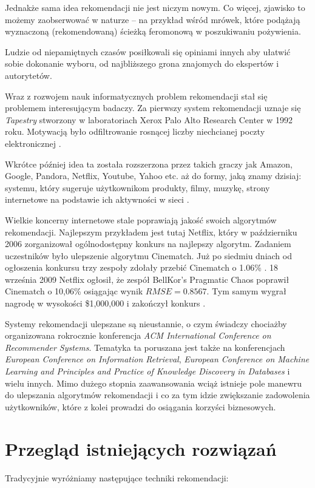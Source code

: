 \documentclass[twoside]{iisthesis}
\begin{document}
	 Jednakże sama idea rekomendacji nie jest niczym nowym. Co więcej, zjawisko to możemy zaobserwować w naturze -- na przykład wśród mrówek, które podążają wyznaczoną (rekomendowaną) ścieżką feromonową w poszukiwaniu pożywienia.
	 
	 Ludzie od niepamiętnych czasów posiłkowali się opiniami innych aby ułatwić sobie dokonanie wyboru, od najbliższego grona znajomych do ekspertów i autorytetów.
	 
	 Wraz z rozwojem nauk informatycznych problem rekomendacji stał się problemem interesującym badaczy. Za pierwszy system rekomendacji uznaje się \textit{Tapestry} stworzony w laboratoriach Xerox Palo Alto Research Center w 1992 roku. Motywacją było odfiltrowanie rosnącej liczby niechcianej poczty elektronicznej \cite{id:FromTapestryToSVD}.
	 
	 Wkrótce później idea ta została rozszerzona przez takich graczy jak Amazon, Google, Pandora, Netflix, Youtube, Yahoo etc. aż do formy, jaką znamy dzisiaj: systemu, który sugeruje użytkownikom produkty, filmy, muzykę, strony internetowe na podstawie ich aktywności w sieci \cite{id:EvolutionOfRecommenderSystems}. 
	 
	 Wielkie koncerny internetowe stale poprawiają jakość swoich algorytmów rekomendacji. Najlepszym przykładem jest tutaj Netflix, który w październiku 2006 zorganizował ogólnodostępny konkurs na najlepszy algorytm. Zadaniem uczestników było ulepszenie algorytmu Cinematch. Już po siedmiu dniach od ogłoszenia konkursu trzy zespoły zdołały przebić Cinematch o 1.06\% \cite{id:NetflixPrize}\cite{id:NetflixPrizeRankings}. 18 września 2009 Netflix ogłosił, że zespół BellKor's Pragmatic Chaos poprawił Cinematch o 10,06\% osiągając wynik $RMSE = 0.8567$. Tym samym wygrał nagrodę w wysokości \$1,000,000 i zakończył konkurs \cite{id:NetflixPrize2}\cite{id:NetflixPrizeRules}.
	 
	 Systemy rekomendacji ulepszane są nieustannie, o czym świadczy chociażby organizowana rokrocznie konferencja\textit{ ACM International Conference on Recommender Systems}. Tematyka ta poruszana jest także na konferencjach \textit{European Conference on Information Retrieval}, \textit{European Conference on Machine Learning and Principles and Practice of Knowledge Discovery in Databases} i wielu innych. Mimo dużego stopnia zaawansowania wciąż istnieje pole manewru do ulepszania algorytmów rekomendacji i co za tym idzie zwiększanie zadowolenia użytkowników, które z kolei prowadzi do osiągania korzyści biznesowych.
	 
 
 \chapter{Przegląd istniejących rozwiązań}
	 Tradycyjnie wyróżniamy następujące techniki rekomendacji: 
	 
\end{document}
